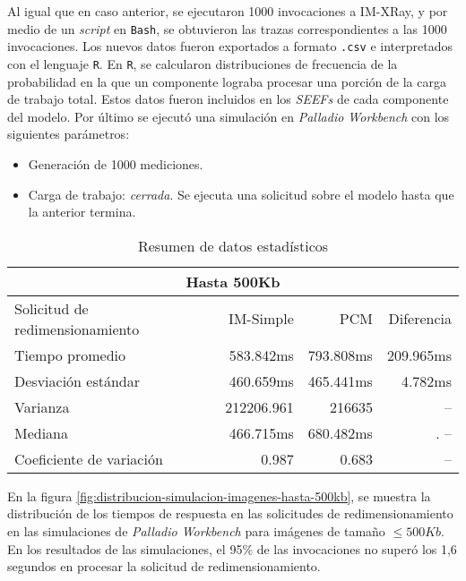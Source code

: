 Al igual que en caso anterior, se ejecutaron 1000 invocaciones a IM-XRay, y por medio de un \emph{script} en \texttt{Bash}, se obtuvieron las trazas correspondientes a las 1000 invocaciones. Los nuevos datos fueron exportados a formato \texttt{.csv} e interpretados con el lenguaje \texttt{R}. En \texttt{R}, se calcularon distribuciones de frecuencia de la probabilidad en la que un componente lograba procesar una porción de la carga de trabajo total. Estos datos fueron incluidos en los \emph{SEEFs} de cada componente del modelo. Por último se ejecutó una simulación en \emph{Palladio Workbench} con los siguientes parámetros:
\begin{itemize}
    \item Generación de 1000 mediciones.
    \item Carga de trabajo: \emph{cerrada}. Se ejecuta una solicitud sobre el modelo hasta que la anterior termina. 
\end{itemize}

\begin{table}
    \centering
    \begin{tabular}{l|r|r|r}
        \toprule[1.5pt]
        \multicolumn{4}{c}{\textbf{Hasta 500Kb}} \\
        \midrule
        Solicitud de redimensionamiento  & IM-Simple & PCM & Diferencia\\
        \midrule
        Tiempo promedio  & 583.842ms & 793.808ms & 209.965ms\\
        Desviación estándar & 460.659ms & 465.441ms & 4.782ms\\
        Varianza & 212206.961 & 216635 & -- \\
        Mediana & 466.715ms & 680.482ms &. -- \\
        Coeficiente de variación & 0.987 & 0.683 & -- \\                       
        \bottomrule[1.5pt]
    \end{tabular}
    \caption{Resumen de datos estadísticos}
    \label{table:datos-estadisticos-hasta-500kb}
\end{table}

En la figura \ref{fig:distribucion-simulacion-imagenes-hasta-500kb}, se muestra la distribución de los tiempos de respuesta en las solicitudes de redimensionamiento en las simulaciones de \emph{Palladio Workbench} para imágenes de tamaño $\leq 500Kb$. En los resultados de las simulaciones, el 95\% de las invocaciones no superó los 1,6 segundos en procesar la solicitud de redimensionamiento.


